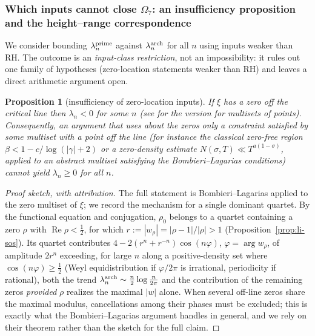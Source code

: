 \documentclass[11pt]{amsart}
\newtheorem{proposition}[theorem]{Proposition}
\theoremstyle{definition}
\theoremstyle{remark}
\theoremstyle{definition}
\renewcommand{\Re}{\operatorname{Re}}
\begin{document}
\subsubsection*{Which inputs cannot close $\Omega_7$: an insufficiency proposition and the height--range correspondence}

We consider bounding $\lambda_n^{\rm prime}$ against $\lambda_n^{\rm arch}$ for all $n$ using inputs
weaker than RH.  The outcome is an \emph{input-class restriction}, not an impossibility: it rules out
one family of hypotheses (zero-location statements weaker than RH) and leaves a direct arithmetic
argument open.

\begin{proposition}[insufficiency of zero-location inputs]\label{prop:unboundable}
If $\xi$ has a zero off the critical line then $\lambda_n<0$ for some $n$ \cite{Li} (see
\cite{BombieriLagarias1999} for the version for multisets of points).  Consequently, an argument that
uses about the zeros only a constraint satisfied by some multiset with a point off the line (for
instance the classical zero-free region $\beta<1-c/\log(|\gamma|+2)$ or a zero-density estimate
$N(\sigma,T)\ll T^{a(1-\sigma)}$, applied to an abstract multiset satisfying the Bombieri--Lagarias
conditions) cannot yield $\lambda_n\ge0$ for all $n$.
\end{proposition}

\begin{proof}[Proof sketch, with attribution]
The full statement is Bombieri--Lagarias \cite{BombieriLagarias1999} applied to the zero multiset of
$\xi$; we record the mechanism for a single dominant quartet.  By the functional equation and
conjugation, $\rho_0$ belongs to a quartet containing a zero $\rho$ with $\Re\rho<\tfrac12$, for which
$r:=|w_\rho|=|\rho-1|/|\rho|>1$ (Proposition~\ref{prop:li-sos}).  Its quartet contributes
$4-2(r^n+r^{-n})\cos(n\varphi)$, $\varphi=\arg w_\rho$, of amplitude $2r^n$ exceeding, for large
$n$ along a positive-density set where $\cos(n\varphi)\ge\tfrac12$ (Weyl equidistribution if
$\varphi/2\pi$ is irrational, periodicity if rational), both the trend
$\lambda_n^{\rm arch}\sim\tfrac n2\log\tfrac n{2\pi}$ and the contribution of the remaining zeros
\emph{provided} $\rho$ realizes the maximal $|w|$ alone.  When several off-line zeros share the maximal
modulus, cancellations among their phases must be excluded; this is exactly what the
Bombieri--Lagarias argument handles in general, and we rely on their theorem rather than the sketch for
the full claim.
\end{proof}
\end{document}
